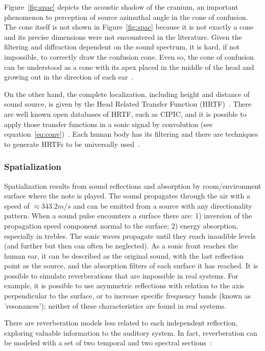 Figure~\ref{fig:spac} depicts the acoustic shadow of the cranium, an important phenomenon to perception of source azimuthal angle in the cone of confusion. The cone itself is not shown in Figure~\ref{fig:spac} because it is not exactly a cone and its precise dimensions were not encountered in the literature. Given the filtering and diffraction dependent on the sound spectrum, it is hard, if not impossible, to correctly draw the confusion cone. Even so, the cone of confusion can be understood as a cone with its apex placed in the middle of the head and growing out in the direction of each ear~\cite{hrtf}.

On the other hand, the complete localization, including height and distance of sound source, is given by the Head Related Transfer Function (HRTF)~\cite{hrtf}. There are well known open databases of HRTF, such as CIPIC, and it is possible to apply those transfer functions in a sonic signal by convolution (see equation~\ref{eq:conv})~\cite{CIPIC}. Each human body has its filtering and there are techniques to generate HRTFs to be universally used~\cite{lazaSPA}. 

\subsubsection{Spatialization}
Spatialization results from sound reflections and absorption by room/environment surface where the note is played. The sound propagates through the air with a speed of $\approx 343.2m/s$ and can be emitted from a source with any directionality pattern. When a sound pulse encounters a surface there are: 1) inversion of the propagation speed component normal to the surface;  2) energy absorption, especially in trebles. The sonic waves propagate until they reach inaudible levels (and further but then can often be neglected). As a sonic front reaches the human ear, it can be described as the original sound, with the last reflection point as the source, and the absorption filters of each surface it has reached. It is possible to simulate reverberations that are impossible in real systems. For example, it is possible to use asymmetric reflections with relation to the axis perpendicular to the surface, or to increase specific frequency bands (known as 'resonances'); neither of these characteristics are found in real systems.

There are reverberation models less related to each independent reflection, exploring valuable information to the auditory system. In fact, reverberation can be modeled with a set of two temporal and two spectral sections~\cite{JOSPhy}:

